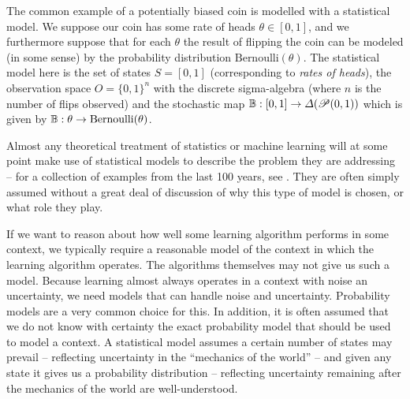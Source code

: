 The common example of a potentially biased coin is modelled with a statistical model. We suppose our coin has some rate of heads $\theta\in [0,1]$, and we furthermore suppose that for each $\theta$ the result of flipping the coin can be modeled (in some sense) by the probability distribution $\text{Bernoulli}(\theta)$. The statistical model here is the set of states $S=[0,1]$ (corresponding to \emph{rates of heads}), the observation space $O=\{0,1\}^n$ with the discrete sigma-algebra (where $n$ is the number of flips observed) and the stochastic map $\mathbb{B}:[0,1]\to \Delta(\mathscr{P}(0,1))$ which is given by $\mathbb{B}:\theta\to \text{Bernoulli}(\theta)$.

Almost any theoretical treatment of statistics or machine learning will at some point make use of statistical models to describe the problem they are addressing -- for a collection of examples from the last 100 years, see \cite{Goodfellow-et-al-2016,vapnik_nature_2013,bishop_pattern_2006,le_cam_comparison_1996,freedman_asymptotic_1963,wald_statistical_1950,de_finetti_foresight_1992,fisher_statistical_1992}. They are often simply assumed without a great deal of discussion of why this type of model is chosen, or what role they play.

If we want to reason about how well some learning algorithm performs in some context, we typically require a reasonable model of the context in which the learning algorithm operates. The algorithms themselves may not give us such a model. Because learning almost always operates in a context with noise an uncertainty, we need models that can handle noise and uncertainty. Probability models are a very common choice for this. In addition, it is often assumed that we do not know with certainty the exact probability model that should be used to model a context. A statistical model assumes a certain number of states may prevail -- reflecting uncertainty in the ``mechanics of the world'' -- and given any state it gives us a probability distribution -- reflecting uncertainty remaining after the mechanics of the world are well-understood.

